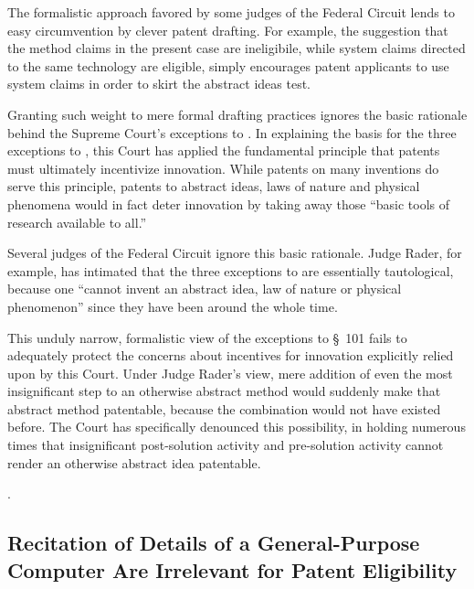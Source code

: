 \documentclass{scotus}
\begin{document}
The formalistic approach favored by some judges of the Federal Circuit lends to
easy circumvention by clever patent drafting. For example, the suggestion that
the method claims in the present case are ineligibile, while system claims
directed to the same technology are eligible, simply encourages patent
applicants to use system claims in order to skirt the abstract ideas test.

Granting such weight to mere formal drafting practices ignores the basic
rationale behind the Supreme Court's exceptions to . In explaining
the basis for the three exceptions to , this Court has applied the
fundamental principle that patents must ultimately incentivize innovation. While
patents on many inventions do serve this principle, patents to abstract ideas,
laws of nature and physical phenomena would in fact deter innovation by taking
away those ``basic tools of research available to all.''

Several judges of the Federal Circuit ignore this basic rationale. Judge Rader,
for example, has intimated that the three exceptions to  are
essentially tautological, because one ``cannot invent an abstract idea, law of
nature or physical phenomenon'' since they have been around the whole time.

This unduly narrow, formalistic view of the exceptions to \S~101 fails to
adequately protect the concerns about incentives for innovation explicitly
relied upon by this Court. Under Judge Rader's view, mere addition of even the
most insignificant step to an otherwise abstract method would suddenly make that
abstract method patentable, because the combination would not have existed
before. The Court has specifically denounced this possibility, in holding
numerous times that insignificant post-solution activity and pre-solution
activity cannot render an otherwise abstract idea patentable.

.



%
%
\subsection{Recitation of Details of a General-Purpose Computer Are Irrelevant
for Patent Eligibility}
\end{document}
